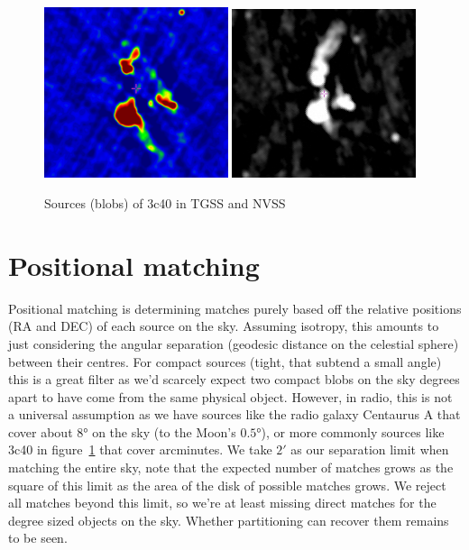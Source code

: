 \documentclass[12pt,a4paper]{article}
\begin{document}
\begin{figure}
    \centering
    \includegraphics[width=0.48\textwidth]{pics/3c40t-cropped.pdf} \;\;
    \includegraphics[width=0.48\textwidth]{pics/3c40n-cropped.pdf}
    \caption{Sources (blobs) of 3c40 in TGSS and NVSS}
    \label{fig:3c40}
\end{figure}



\newpage
\section{Positional matching}
Positional matching is determining matches purely based off the relative positions (RA and DEC) of each source on the sky. Assuming isotropy, this amounts to just considering the angular separation (geodesic distance on the celestial sphere) between their centres. For compact sources (tight, that subtend a small angle) this is a great filter as we'd scarcely expect two compact blobs on the sky degrees apart to have come from the same physical object. However, in radio, this is not a universal assumption as we have sources like the radio galaxy Centaurus A that cover about $\ang{8}$ on the sky (to the Moon's $\ang{0.5}$), or more commonly sources like 3c40 in figure~\ref{fig:3c40} that cover arcminutes. We take $\ang{;2;}$ as our separation limit when matching the entire sky, note that the expected number of matches grows as the square of this limit as the area of the disk of possible matches grows. We reject all matches beyond this limit, so we're at least missing direct matches for the degree sized objects on the sky. Whether partitioning can recover them remains to be seen.
\end{document}
